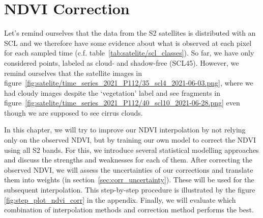 \chapter{NDVI Correction} \label{sec:corr}

{
    Let's remind ourselves that the data from the S2 satellites is distributed  with an SCL and we therefore have some evidence about what is observed at each pixel for each sampled time (c.f. table~\ref{tab:satelite/scl_classes}). So far, we have only considered points, labeled as cloud- and shadow-free (SCL45). However, we remind ourselves that the satellite images in figure~\ref{fig:satelite/time_series_2021_P112/35_scl4_2021-06-03.png}, where we had cloudy images despite the `vegetation' label and see fragments in figure~\ref{fig:satelite/time_series_2021_P112/40_scl10_2021-06-28.png} even though we are supposed to see cirrus clouds.
    


    
    In this chapter, we will try to improve our NDVI interpolation by not relying only on the observed NDVI, but by training our own model to correct the NDVI using all S2 bands. For this, we introduce several statistical modelling approaches and discuss the strengths and weaknesses for each of them. After correcting the observed NDVI, we will assess the uncertainties of our corrections and translate them into weights (in section~\ref{sec:corr_uncertainty}). These will be used for the subsequent interpolation. This step-by-step procedure is illustrated by the figure \ref{fig:step_plot_ndvi_corr} in the appendix. Finally, we will evaluate which combination of interpolation methods and correction method performs the best.
}

